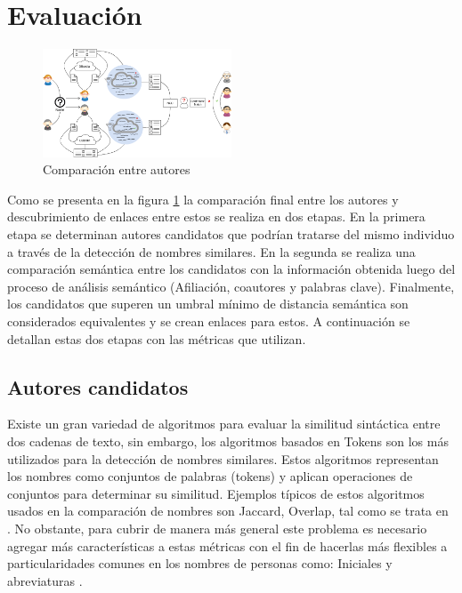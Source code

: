 \documentclass[conference]{IEEEtran}
\begin{document}
\section{Evaluación}

\begin{figure}[!t]
\centering
\includegraphics[width=0.5\textwidth]{proceso}
\caption{Comparaci\'on entre autores}
\label{fig:comparacion}
\end{figure}

Como se presenta en la figura \ref{fig:comparacion} la comparación final entre los autores y descubrimiento de enlaces entre estos se realiza en dos etapas. En la primera etapa se determinan autores candidatos que podrían tratarse del mismo individuo a través de la detección de nombres similares. En la segunda se realiza una comparación semántica entre los candidatos con la información obtenida luego del proceso de análisis semántico (Afiliación, coautores y palabras clave). Finalmente, los candidatos que superen un umbral mínimo de distancia semántica son considerados equivalentes y se crean enlaces para estos. A continuación se detallan estas dos etapas con las métricas que utilizan.

\subsection{Autores candidatos}
Existe un gran variedad de algoritmos para evaluar la similitud sintáctica entre dos cadenas de texto, sin embargo, los algoritmos basados en Tokens son los más utilizados para la detección de nombres similares. Estos algoritmos representan los nombres como conjuntos de palabras (tokens) y aplican operaciones de conjuntos para determinar su similitud. Ejemplos típicos de estos algoritmos usados en la comparación de nombres son Jaccard, Overlap, tal como se trata en  \cite{huynh2013vietnamese}. No obstante, para cubrir de manera más general este problema es necesario agregar más características a estas métricas con el fin de hacerlas más flexibles a particularidades comunes en los nombres de personas como: Iniciales y abreviaturas \cite{shoaib2015improving}.
\end{document}
